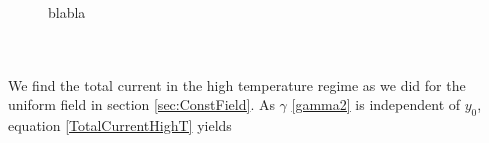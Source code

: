 \begin{figure}[hhh]
\centering
\hfill
{}
\caption{blabla}
\label{fig:motionEarth}
\end{figure}
\\
\\
We find the total current in the high temperature regime as we did for the uniform field in section \ref{sec:ConstField}. As $\gamma$ \eqref{gamma2} is independent of $y_0$, equation \eqref{TotalCurrentHighT} yields
